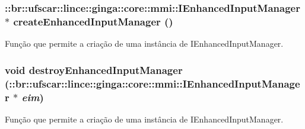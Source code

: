 \subsubsection[{createEnhancedInputManager}]{\setlength{\rightskip}{0pt plus 5cm}::{\bf br::ufscar::lince::ginga::core::mmi::IEnhancedInputManager}$\ast$ createEnhancedInputManager ()}\label{EnhancedInputManager_8cpp_aa498d99e7536b1478cbd947a19ef9344}
Função que permite a criação de uma instância de IEnhancedInputManager. 
\subsubsection[{destroyEnhancedInputManager}]{\setlength{\rightskip}{0pt plus 5cm}void destroyEnhancedInputManager (::{\bf br::ufscar::lince::ginga::core::mmi::IEnhancedInputManager} $\ast$ {\em eim})}\label{EnhancedInputManager_8cpp_a8c555ff79a4de58eb345644b38c998b4}
Função que permite a criação de uma instância de IEnhancedInputManager. 